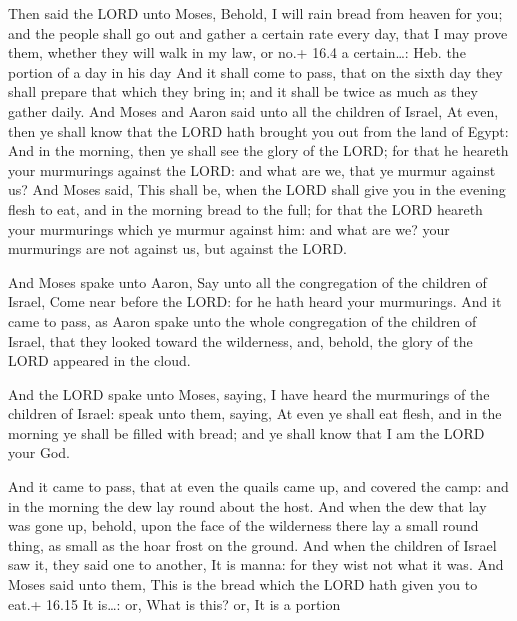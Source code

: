  Then said the LORD unto Moses, Behold, I will rain bread
from heaven for you; and the people shall go out and gather a certain
rate every day, that I may prove them, whether they will walk in my law,
or no.+ 16.4 a certain\ldots: Heb. the portion of a day in his day
 And it shall come to pass, that on the sixth day they shall
prepare that which they bring in; and it shall be twice as much as they
gather daily.  And Moses and Aaron said unto all the
children of Israel, At even, then ye shall know that the LORD hath
brought you out from the land of Egypt:  And in the morning,
then ye shall see the glory of the LORD; for that he heareth your
murmurings against the LORD: and what are we, that ye murmur against us?
 And Moses said, This shall be, when the LORD shall give you
in the evening flesh to eat, and in the morning bread to the full; for
that the LORD heareth your murmurings which ye murmur against him: and
what are we? your murmurings are not against us, but against the LORD.

 And Moses spake unto Aaron, Say unto all the congregation
of the children of Israel, Come near before the LORD: for he hath heard
your murmurings.  And it came to pass, as Aaron spake unto
the whole congregation of the children of Israel, that they looked
toward the wilderness, and, behold, the glory of the LORD appeared in
the cloud.

 And the LORD spake unto Moses, saying,  I
have heard the murmurings of the children of Israel: speak unto them,
saying, At even ye shall eat flesh, and in the morning ye shall be
filled with bread; and ye shall know that I am the LORD your God.

 And it came to pass, that at even the quails came up, and
covered the camp: and in the morning the dew lay round about the host.
 And when the dew that lay was gone up, behold, upon the
face of the wilderness there lay a small round thing, as small as the
hoar frost on the ground.  And when the children of Israel
saw it, they said one to another, It is manna: for they wist not what it
was. And Moses said unto them, This is the bread which the LORD hath
given you to eat.+ 16.15 It is\ldots: or, What is this? or, It is a
portion

